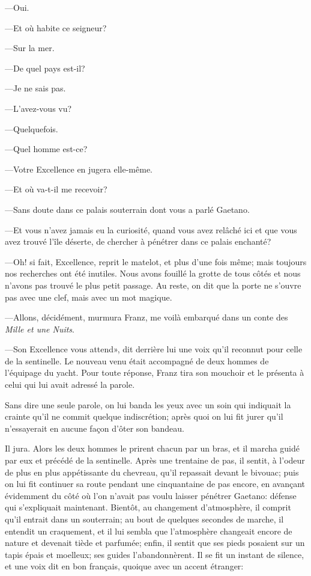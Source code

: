 —Oui.

—Et où habite ce seigneur?

—Sur la mer.

—De quel pays est-il?

—Je ne sais pas.

—L'avez-vous vu?

—Quelquefois.

—Quel homme est-ce?

—Votre Excellence en jugera elle-même.

—Et où va-t-il me recevoir?

—Sans doute dans ce palais souterrain dont vous a parlé Gaetano.

—Et vous n'avez jamais eu la curiosité, quand vous avez relâché ici et que vous avez trouvé l'île déserte, de chercher à pénétrer dans ce palais enchanté?

—Oh! si fait, Excellence, reprit le matelot, et plus d'une fois même; mais toujours nos recherches ont été inutiles. Nous avons fouillé la grotte de tous côtés et nous n'avons pas trouvé le plus petit passage. Au reste, on dit que la porte ne s'ouvre pas avec une clef, mais avec un mot magique.

—Allons, décidément, murmura Franz, me voilà embarqué dans un conte des \textit{Mille et une Nuits}.

—Son Excellence vous attend», dit derrière lui une voix qu'il reconnut pour celle de la sentinelle. Le nouveau venu était accompagné de deux hommes de l'équipage du yacht. Pour toute réponse, Franz tira son mouchoir et le présenta à celui qui lui avait adressé la parole.

Sans dire une seule parole, on lui banda les yeux avec un soin qui indiquait la crainte qu'il ne commit quelque indiscrétion; après quoi on lui fit jurer qu'il n'essayerait en aucune façon d'ôter son bandeau.

Il jura. Alors les deux hommes le prirent chacun par un bras, et il marcha guidé par eux et précédé de la sentinelle. Après une trentaine de pas, il sentit, à l'odeur de plus en plus appétissante du chevreau, qu'il repassait devant le bivouac; puis on lui fit continuer sa route pendant une cinquantaine de pas encore, en avançant évidemment du côté où l'on n'avait pas voulu laisser pénétrer Gaetano: défense qui s'expliquait maintenant. Bientôt, au changement d'atmosphère, il comprit qu'il entrait dans un souterrain; au bout de quelques secondes de marche, il entendit un craquement, et il lui sembla que l'atmosphère changeait encore de nature et devenait tiède et parfumée; enfin, il sentit que ses pieds posaient sur un tapis épais et moelleux; ses guides l'abandonnèrent. Il se fit un instant de silence, et une voix dit en bon français, quoique avec un accent étranger:

